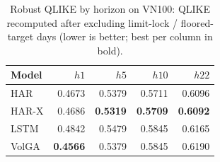 \begin{table}[t]
\centering
\caption{Robust QLIKE by horizon on VN100: QLIKE recomputed after excluding limit-lock / floored-target days (lower is better; best per column in bold).}
\label{tab:qlike_robust_vn100}
\begin{tabular}{lrrrr}
\toprule
Model & $h1$ & $h5$ & $h10$ & $h22$ \\
\midrule
HAR & 0.4673 & 0.5379 & 0.5711 & 0.6096 \\
HAR-X & 0.4686 & \textbf{0.5319} & \textbf{0.5709} & \textbf{0.6092} \\
LSTM & 0.4842 & 0.5479 & 0.5845 & 0.6165 \\
VolGA & \textbf{0.4566} & 0.5379 & 0.5845 & 0.6190 \\
\bottomrule
\end{tabular}
\end{table}
